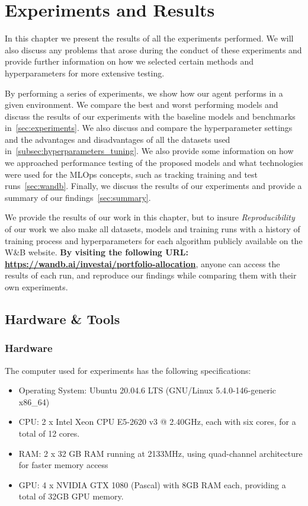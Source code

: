 \documentclass[../xlapes02]{subfiles}
\begin{document}
    \chapter{Experiments and Results}\label{ch:experiments-and-results}
    In this chapter we present the results of all the experiments performed. We will also discuss any problems that arose during the conduct of these experiments and provide further information on how we selected certain methods and hyperparameters for more extensive testing.

    By performing a series of experiments, we show how our agent performs in a given environment. We compare the best and worst performing models and discuss the results of our experiments with the baseline models and benchmarks in~\cref{sec:experiments}. We also discuss and compare the hyperparameter settings and the advantages and disadvantages of all the datasets used in~\cref{subsec:hyperparameters_tuning}. We also provide some information on how we approached performance testing of the proposed models and what technologies were used for the MLOps concepts, such as tracking training and test runs~\cref{sec:wandb}. Finally, we discuss the results of our experiments and provide a summary of our findings~\cref{sec:summary}.

    We provide the results of our work in this chapter, but to insure \emph{Reproducibility} of our work we also make all datasets, models and training runs with a history of training process and hyperparameters for each algorithm publicly available on the W\&B website. \textbf{By visiting the following URL: \url{https://wandb.ai/investai/portfolio-allocation}}, anyone can access the results of each run, and reproduce our findings while comparing them with their own experiments.


    \section{Hardware \& Tools}\label{sec:hardware-tools}

    \subsection{Hardware}\label{subsec:hardware}
    The computer used for experiments has the following specifications:
    \begin{itemize}
        \item Operating System: Ubuntu 20.04.6 LTS (GNU/Linux 5.4.0-146-generic x86\_64)
        \item CPU: 2 x Intel Xeon CPU E5-2620 v3 @ 2.40GHz, each with six cores, for a total of 12 cores.
        \item RAM: 2 x 32 GB RAM running at 2133MHz, using quad-channel architecture for faster memory access
        \item GPU: 4 x NVIDIA GTX 1080 (Pascal) with 8GB RAM each, providing a total of 32GB GPU memory.
    \end{itemize}
\end{document}
